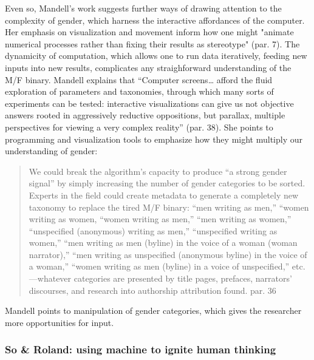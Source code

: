 \documentclass[11pt]{article}
\begin{document}
Even so, Mandell's work suggests further ways of drawing attention to
the complexity of gender, which harness the interactive affordances of
the computer. Her emphasis on visualization and movement inform how
one might "animate numerical processes rather than fixing their
results as stereotype" (par. 7). The dynamicity of computation, which
allows one to run data iteratively, feeding new inputs into new
results, complicates any straighforward understanding of the M/F
binary. Mandell explains that “Computer screens\ldots{} afford the fluid
exploration of parameters and taxonomies, through which many sorts of
experiments can be tested: interactive visualizations can give us not
objective answers rooted in aggressively reductive oppositions, but
parallax, multiple perspectives for viewing a very complex reality”
(par. 38). She points to programming and visualization tools to
emphasize how they might multiply our understanding of gender:

\begin{quote}
We could break the algorithm’s capacity to produce “a strong gender
signal” by simply increasing the number of gender categories to be
sorted. Experts in the field could create metadata to generate a
completely new taxonomy to replace the tired M/F binary: “men writing
as men,” “women writing as women, “women writing as men,” “men writing
as women,” “unspecified (anonymous) writing as men,” “unspecified
writing as women,” “men writing as men (byline) in the voice of a
woman (woman narrator),” “men writing as unspecified (anonymous
byline) in the voice of a woman,” “women writing as men (byline) in a
voice of unspecified,” etc.—whatever categories are presented by title
pages, prefaces, narrators’ discourses, and research into authorship
attribution found. par. 36
\end{quote}

Mandell points to manipulation of gender categories, which gives the
researcher more opportunities for input.

\subsubsection{So \& Roland: using machine to ignite human thinking}
\label{sec:org2379e1e}
\end{document}
